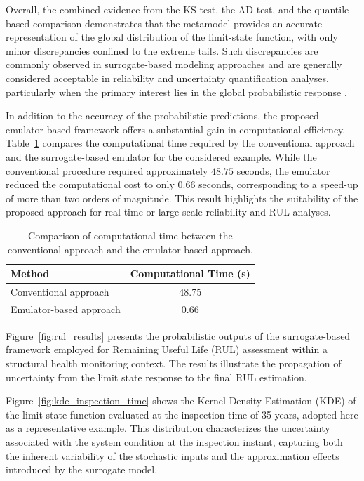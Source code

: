 Overall, the combined evidence from the KS test, the AD test, and the quantile-based comparison demonstrates that the metamodel provides an accurate representation of the global distribution of the limit-state function, with only minor discrepancies confined to the extreme tails. Such discrepancies are commonly observed in surrogate-based modeling approaches and are generally considered acceptable in reliability and uncertainty quantification analyses, particularly when the primary interest lies in the global probabilistic response \cite{derkiureghian2009uq, sudret2008pce}.

In addition to the accuracy of the probabilistic predictions, the proposed emulator-based framework offers a substantial gain in computational efficiency. Table~\ref{tab:computational_time} compares the computational time required by the conventional approach and the surrogate-based emulator for the considered example. While the conventional procedure required approximately $48.75$ seconds, the emulator reduced the computational cost to only $0.66$ seconds, corresponding to a speed-up of more than two orders of magnitude. This result highlights the suitability of the proposed approach for real-time or large-scale reliability and RUL analyses.

\begin{table}[H]
\centering
\caption{Comparison of computational time between the conventional approach and the emulator-based approach.}
\label{tab:computational_time}
\begin{tabular}{l c}
\hline
\textbf{Method} & \textbf{Computational Time (s)} \\
\hline
Conventional approach & 48.75 \\
Emulator-based approach & 0.66 \\
\hline
\end{tabular}
\end{table}

Figure~\ref{fig:rul_results} presents the probabilistic outputs of the surrogate-based framework employed for Remaining Useful Life (RUL) assessment within a structural health monitoring context. The results illustrate the propagation of uncertainty from the limit state response to the final RUL estimation.

Figure~\ref{fig:kde_inspection_time} shows the Kernel Density Estimation (KDE) of the limit state function evaluated at the inspection time of 35 years, adopted here as a representative example. This distribution characterizes the uncertainty associated with the system condition at the inspection instant, capturing both the inherent variability of the stochastic inputs and the approximation effects introduced by the surrogate model.

